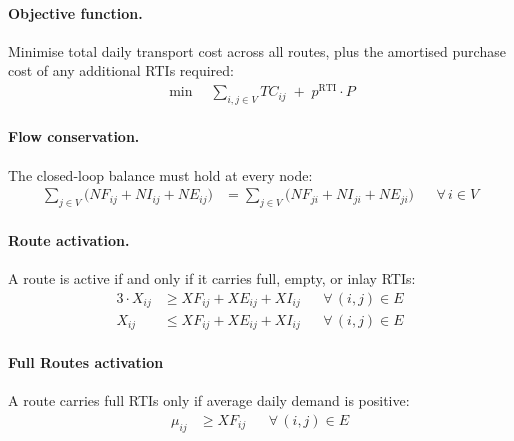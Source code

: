 \paragraph{Objective function.}
Minimise total daily transport cost across all routes,
plus the amortised purchase cost of any additional RTIs required:
%
\begin{align}
  \min \quad
  \sum_{i,j \in V} TC_{ij}
  \;+\;
  p^{\text{RTI}} \cdot P
  \label{eq:objective}
\end{align}


\paragraph{Flow conservation.}
The closed-loop balance must hold at every node:
%
\begin{align}
  \sum_{j\in V}\!\bigl(NF_{ij}+NI_{ij}+NE_{ij}\bigr)
  &=
  \sum_{j\in V}\!\bigl(NF_{ji}+NI_{ji}+NE_{ji}\bigr)
  && \forall\, i\in V
  \label{eq:conservation}
\end{align}


\paragraph{Route activation.}
A route is active if and only if it carries full, empty, or inlay RTIs:
%
\begin{align}
  3\cdot X_{ij} &\geq XF_{ij}+XE_{ij}+XI_{ij}
  && \forall\,(i,j)\in E \\
  X_{ij} &\leq XF_{ij}+XE_{ij}+XI_{ij}
  && \forall\,(i,j)\in E
\end{align}


\paragraph{Full Routes activation}
A route carries full RTIs only if average daily demand is positive:
%
\begin{align}
  \mu_{ij} &\geq XF_{ij}
  && \forall\,(i,j)\in E
  \label{eq:type-selection}
\end{align}

